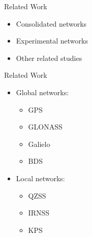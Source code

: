 %
%
%
%
%

%
%
%
%
%


\begin{frame}{Related Work}

    \begin{itemize}
        \item Consolidated networks
        \vspace{0.3cm}
        \item Experimental networks
        \vspace{0.3cm}
        \item Other related studies
    \end{itemize}

\end{frame}

\begin{frame}{Related Work}

    \begin{itemize}
        \item Global networks:
            \begin{itemize}
                \item GPS
                \item GLONASS
                \item Galielo
                \item BDS
            \end{itemize}
        \item Local networks:
            \begin{itemize}
                \item QZSS
                \item IRNSS
                \item KPS
            \end{itemize}
    \end{itemize}

\end{frame}

